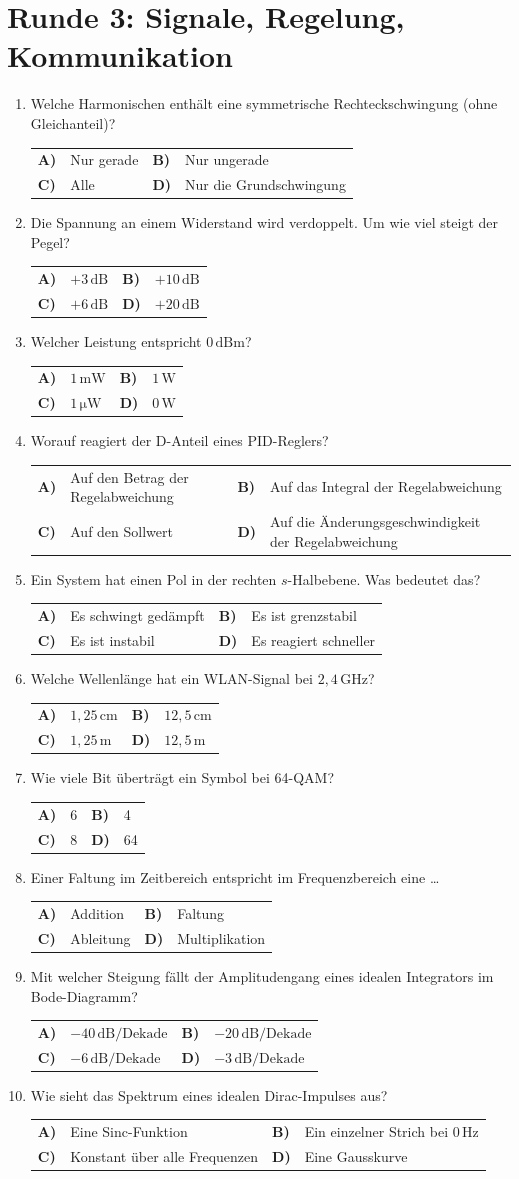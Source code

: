 \documentclass[a4paper,11pt]{article}
\makeatletter
\newif\ifloesung
\newcommand{\loesung}[1]{\ifloesung\par\smallskip\noindent\textcolor{zwetschge}{\textbf{Lösung:} #1}\fi}
\newcommand{\mc}[6]{%
  \item #1\par\nopagebreak\smallskip
  \noindent\begin{tabularx}{\linewidth}{@{}>{\bfseries}l X >{\bfseries}l X@{}}
    A) & #2 & B) & #3 \\[0.25em]
    C) & #4 & D) & #5
  \end{tabularx}%
  \loesung{#6}}
\newcommand{\runde}[2]{\section{Runde #1: #2}}
\makeatother
\begin{document}
\runde{3}{Signale, Regelung, Kommunikation}
\begin{enumerate}
  \mc{Welche Harmonischen enthält eine symmetrische Rechteckschwingung (ohne Gleichanteil)?}
     {Nur gerade}{Nur ungerade}{Alle}{Nur die Grundschwingung}
     {B. $f_0, 3f_0, 5f_0, \dots$ mit Amplituden $\sim 1/n$.}

  \mc{Die Spannung an einem Widerstand wird verdoppelt. Um wie viel steigt der Pegel?}
     {$+3\,\mathrm{dB}$}{$+10\,\mathrm{dB}$}{$+6\,\mathrm{dB}$}{$+20\,\mathrm{dB}$}
     {C. $20\log_{10}2 \approx 6\,\mathrm{dB}$. $3\,\mathrm{dB}$ gelten für die doppelte Leistung.}

  \mc{Welcher Leistung entspricht $0\,\mathrm{dBm}$?}
     {$1\,\mathrm{mW}$}{$1\,\mathrm{W}$}{$1\,\mathrm{\mu W}$}{$0\,\mathrm{W}$}
     {A. dBm ist auf $1\,\mathrm{mW}$ bezogen.}

  \mc{Worauf reagiert der D-Anteil eines PID-Reglers?}
     {Auf den Betrag der Regelabweichung}{Auf das Integral der Regelabweichung}{Auf den Sollwert}{Auf die Änderungsgeschwindigkeit der Regelabweichung}
     {D. Deshalb verstärkt er auch Messrauschen stark.}

  \mc{Ein System hat einen Pol in der rechten $s$-Halbebene. Was bedeutet das?}
     {Es schwingt gedämpft}{Es ist grenzstabil}{Es ist instabil}{Es reagiert schneller}
     {C. Der Pol führt zu einem aufklingenden Exponentialterm $e^{\sigma t}$ mit $\sigma > 0$.}

  \mc{Welche Wellenlänge hat ein WLAN-Signal bei $2{,}4\,\mathrm{GHz}$?}
     {$1{,}25\,\mathrm{cm}$}{$12{,}5\,\mathrm{cm}$}{$1{,}25\,\mathrm{m}$}{$12{,}5\,\mathrm{m}$}
     {B. $\lambda = c/f = 3\cdot10^8/2{,}4\cdot10^9 = 0{,}125\,\mathrm{m}$.}

  \mc{Wie viele Bit überträgt ein Symbol bei 64-QAM?}
     {6}{4}{8}{64}
     {A. $\log_2 64 = 6$.}

  \mc{Einer Faltung im Zeitbereich entspricht im Frequenzbereich eine \dots}
     {Addition}{Faltung}{Ableitung}{Multiplikation}
     {D. Faltungssatz der Fourier-Transformation.}

  \mc{Mit welcher Steigung fällt der Amplitudengang eines idealen Integrators im Bode-Diagramm?}
     {$-40\,\mathrm{dB/Dekade}$}{$-20\,\mathrm{dB/Dekade}$}{$-6\,\mathrm{dB/Dekade}$}{$-3\,\mathrm{dB/Dekade}$}
     {B. Das entspricht $-6\,\mathrm{dB}$ pro \emph{Oktave}, daher die Falle bei C.}

  \mc{Wie sieht das Spektrum eines idealen Dirac-Impulses aus?}
     {Eine Sinc-Funktion}{Ein einzelner Strich bei $0\,\mathrm{Hz}$}{Konstant über alle Frequenzen}{Eine Gausskurve}
     {C. Der Dirac enthält alle Frequenzen gleich stark. Der Strich bei $0\,\mathrm{Hz}$ gehört zum Gleichsignal.}
\end{enumerate}
\end{document}

